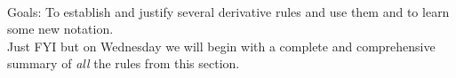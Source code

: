 \documentclass[11pt,fleqn]{article}
\begin{document}
\renewcommand{\headrulewidth}{0pt}
\newcommand{\blank}[1]{\rule{#1}{0.75pt}}
\newcommand{\bc}{\begin{center}}
\newcommand{\ec}{\end{center}}
\renewcommand{\d}{\displaystyle}

\vspace*{-0.7in}

\begin{center}
  \large
  \\
\end{center}
Goals: To establish and justify several derivative rules and use them and to learn some new notation. \\ Just FYI but on Wednesday we will begin with a complete and comprehensive summary of \emph{all} the rules from this section.\\
\end{document}
